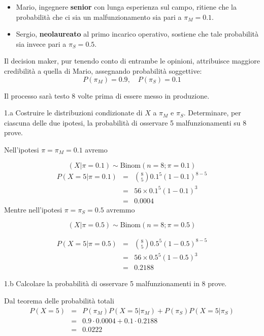 \documentclass[
  11pt,
]{book}
\providecommand{\tightlist}{%
  \setlength{\itemsep}{0pt}\setlength{\parskip}{0pt}}
\theoremstyle{mytheoremstyle}
\theoremstyle{mydefstyle}
\newenvironment{sol}
  {
  \begin{tcolorbox}[enhanced,breakable,arc=0.1mm,boxrule=1pt,colback=white,colframe=iblue,
  title=\bf \fontfamily{lmss}\selectfont \hspace{.5 cm} Soluzione,drop fuzzy shadow]

}{
\end{tcolorbox}
  }
\begin{document}
\begin{itemize}
\tightlist
\item
  Mario, ingegnere \textbf{senior} con lunga esperienza sul campo, ritiene che la probabilità che ci sia un malfunzionamento sia pari a \(\pi_M = 0.1\).
\item
  Sergio, \textbf{neolaureato} al primo incarico operativo, sostiene che tale probabilità sia invece pari a \(\pi_S = 0.5\).
\end{itemize}

Il decision maker, pur tenendo conto di entrambe le opinioni, attribuisce maggiore credibilità a quella di Mario, assegnando probabilità soggettive:
\[
P(\pi_M) = 0.9,\quad P(\pi_S) = 0.1
\]

Il processo sarà testo 8 volte prima di essere messo in produzione.

1.a Costruire le distribuzioni condizionate di \(X\) a \(\pi_M\) e \(\pi_S\). Determinare, per ciascuna delle due ipotesi, la probabilità di osservare 5 malfunzionamenti su 8 prove.

\begin{sol}
Nell'ipotesi \(\pi=\pi_M=0.1\) avremo

\[
(X|\pi=0.1)\sim\text{Binom}(n=8;\pi=0.1)
\]
\begin{eqnarray*}
      P( X = 5 |\pi=0.1) &=& \binom{ 8 }{ 5 } 0.1 ^{ 5 }(1- 0.1 )^{ 8 - 5 }  \\               
      &=& 56 \times 0.1 ^{ 5 }(1- 0.1 )^{ 3 } \\                 
      &=& 0.0004
\end{eqnarray*}
Mentre nell'ipotesi \(\pi=\pi_S=0.5\) avremmo

\[
(X|\pi=0.5)\sim\text{Binom}(n=8;\pi=0.5)
\]

\begin{eqnarray*}
      P(X = 5|\pi=0.5) &=& \binom{ 8 }{ 5 } 0.5 ^{ 5 }(1- 0.5 )^{ 8 - 5 } \\                 
      &=& 56 \times 0.5 ^{ 5 }(1- 0.5 )^{ 3 } \\                 
      &=& 0.2188 
\end{eqnarray*}

\end{sol}

1.b Calcolare la probabilità di osservare 5 malfunzionamenti in 8 prove.

\begin{sol}
Dal teorema delle probabilità totali
\begin{eqnarray*}
  P(X=5) &=& P(\pi_M)P(X=5|\pi_M) + P(\pi_S)P(X=5|\pi_S)\\
         &=& 0.9\cdot0.0004+0.1\cdot0.2188\\
         &=& 0.0222
\end{eqnarray*}

\end{sol}
\end{document}

